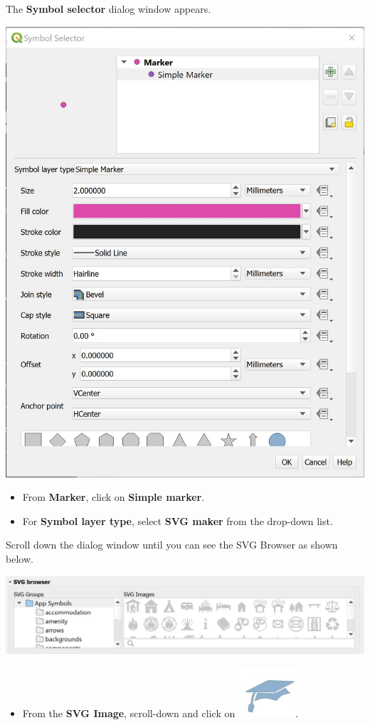 \documentclass[
  letterpaper,
  DIV=11,
  numbers=noendperiod]{scrreprt}
\providecommand{\tightlist}{%
  \setlength{\itemsep}{0pt}\setlength{\parskip}{0pt}}\usepackage{longtable,booktabs,array}
\begin{document}
The \textbf{Symbol selector} dialog window appears.

\includegraphics{./img03/image6.jpg}

\begin{itemize}
\item
  From \textbf{Marker}, click on \textbf{Simple marker}.
\item
  For \textbf{Symbol layer type}, select \textbf{SVG maker} from the
  drop-down list.
\end{itemize}

Scroll down the dialog window until you can see the SVG Browser as shown
below.

\includegraphics{./img03/image7.jpg}

\begin{itemize}
\tightlist
\item
  From the \textbf{SVG Image}, scroll-down and click on
  \includegraphics{./img03/image8.jpg}.
\end{itemize}
\end{document}
